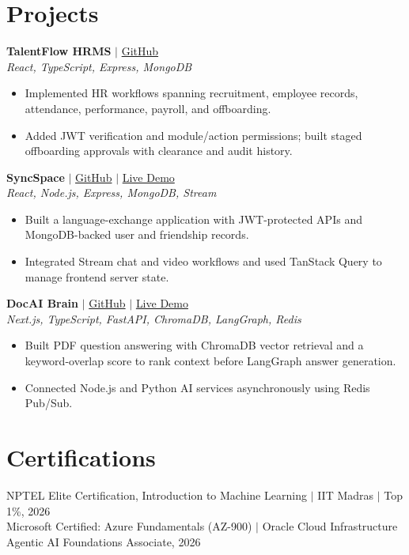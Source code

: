 \documentclass[10pt,letterpaper]{article}
\begin{document}
\section*{Projects}
\textbf{TalentFlow HRMS} $\mid$ \href{https://github.com/Adityaraj-r/talentflow-hrms}{GitHub}\\[-1pt]
\textit{React, TypeScript, Express, MongoDB}
\begin{itemize}
\item Implemented HR workflows spanning recruitment, employee records, attendance, performance, payroll, and offboarding.
\item Added JWT verification and module/action permissions; built staged offboarding approvals with clearance and audit history.
\end{itemize}
\textbf{SyncSpace} $\mid$ \href{https://github.com/Adityaraj-r/SyncSpace}{GitHub} $\mid$ \href{https://syncspace-0a4n.onrender.com/login}{Live Demo}\\[-1pt]
\textit{React, Node.js, Express, MongoDB, Stream}
\begin{itemize}
\item Built a language-exchange application with JWT-protected APIs and MongoDB-backed user and friendship records.
\item Integrated Stream chat and video workflows and used TanStack Query to manage frontend server state.
\end{itemize}
\textbf{DocAI Brain} $\mid$ \href{https://github.com/Adityaraj-r/DocAi}{GitHub} $\mid$ \href{https://docbrain-ai-frontend.vercel.app/}{Live Demo}\\[-1pt]
\textit{Next.js, TypeScript, FastAPI, ChromaDB, LangGraph, Redis}
\begin{itemize}
\item Built PDF question answering with ChromaDB vector retrieval and a keyword-overlap score to rank context before LangGraph answer generation.
\item Connected Node.js and Python AI services asynchronously using Redis Pub/Sub.
\end{itemize}

\section*{Certifications}
NPTEL Elite Certification, Introduction to Machine Learning $\mid$ IIT Madras $\mid$ Top 1\%, 2026\\[-1pt]
Microsoft Certified: Azure Fundamentals (AZ-900) $\mid$ Oracle Cloud Infrastructure Agentic AI Foundations Associate, 2026
\end{document}
